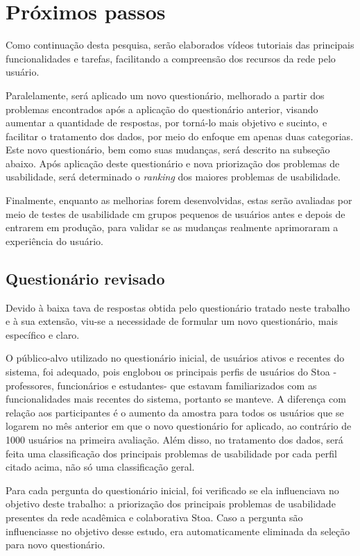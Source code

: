 \section{Próximos passos}
\label{sec:futuro} 

    Como continuação desta pesquisa, serão elaborados vídeos tutoriais das principais funcionalidades e tarefas, facilitando a compreensão dos recursos da rede pelo usuário.

    Paralelamente, será aplicado um novo questionário, melhorado a partir dos problemas encontrados após a aplicação do questionário anterior, visando aumentar a quantidade de respostas, por torná-lo mais objetivo e sucinto, e facilitar o tratamento dos dados, por meio do enfoque em apenas duas categorias. Este novo questionário, bem como suas mudanças, será descrito na subseção abaixo. Após aplicação deste questionário e nova priorização dos problemas de usabilidade, será determinado o \emph{ranking} dos maiores problemas de usabilidade.

    Finalmente, enquanto as melhorias forem desenvolvidas, estas serão avaliadas por meio de testes de usabilidade cm grupos pequenos de usuários antes e depois de entrarem em produção, para validar se as mudanças realmente aprimoraram a experiência do usuário.

\subsection{Questionário revisado}

    Devido à baixa tava de respostas obtida pelo questionário tratado neste trabalho e à sua extensão, viu-se a necessidade de formular um novo questionário, mais específico e claro. 

    O público-alvo utilizado no questionário inicial, de usuários ativos e recentes do sistema, foi adequado, pois englobou os principais perfis de usuários do Stoa - professores, funcionários e estudantes- que estavam familiarizados com as funcionalidades mais recentes do sistema, portanto se manteve. A diferença com relação aos participantes é o aumento da amostra para todos os usuários que se logarem no mês anterior em que o novo questionário for aplicado, ao contrário de 1000 usuários na primeira avaliação. Além disso, no tratamento dos dados, será feita uma classificação dos principais problemas de usabilidade por cada perfil citado acima, não só uma classificação geral.

    Para cada pergunta do questionário inicial, foi verificado se ela influenciava no objetivo deste trabalho: a priorização dos principais problemas de usabilidade presentes da rede acadêmica e colaborativa Stoa. Caso a pergunta são influenciasse no objetivo desse estudo, era automaticamente eliminada da seleção para  novo questionário.


